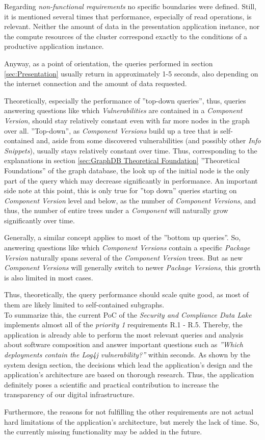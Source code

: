 Regarding \emph{non-functional requirements} no specific boundaries were defined. Still, it is mentioned several times that performance, especially of read operations, is relevant. Neither the amount of data in the presentation application instance, nor the compute resources of the cluster correspond exactly to the conditions of a productive application instance.\par
Anyway, as a point of orientation, the queries performed in section \ref{sec:Presentation} usually return in approximately 1-5 seconds, also depending on the internet connection and the amount of data requested.\par 
Theoretically, especially the performance of ''top-down queries'', thus, queries answering questions like which \emph{Vulnerabilities} are contained in a \emph{Component Version}, should stay relatively constant even with far more nodes in the graph over all. ''Top-down'', as \emph{Component Versions} build up a tree that is self-contained and, aside from some discovered vulnerabilities (and possibly other \emph{Info Snippets}), usually stays relatively constant over time. Thus, corresponding to the explanations in section \ref{sec:GraphDB Theoretical Foundation} ''Theoretical Foundations'' of the graph database, the look up of the initial node is the only part of the query which may decrease significantly in performance. An important side note at this point, this is only true for ''top down'' queries starting on \emph{Component Version} level and below, as the number of \emph{Component Versions}, and thus, the number of entire trees under a \emph{Component} will naturally grow significantly over time.\par
Generally, a similar concept applies to most of the ''bottom up queries''. So, answering questions like which \emph{Component Versions} contain a specific \emph{Package Version} naturally spans several of the \emph{Component Version} trees. But as new \emph{Component Versions} will generally switch to newer \emph{Package Versions}, this growth is also limited in most cases.\par
Thus, theoretically, the query performance should scale quite good, as most of them are likely limited to self-contained subgraphs.\\

To summarize this, the current PoC of the \emph{Security and Compliance Data Lake} implements almost all of the \emph{priority 1} requirements R.1 - R.5. Thereby, the application is already able to perform the most relevant queries and analysis about software composition and answer important questions such as \emph{''Which deployments contain the Log4j vulnerability?''} within seconds. As shown by the system design section, the decisions which lead the application's design and the application's architecture are based on thorough research. Thus, the application definitely poses a scientific and practical contribution to increase the transparency of our digital infrastructure.\par
Furthermore, the reasons for not fulfilling the other requirements are not actual hard limitations of the application's architecture, but merely the lack of time. So, the currently missing functionality may be added in the future.

